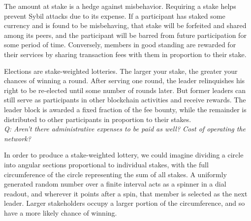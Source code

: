 \documentclass{yellowpaper}
\begin{document}
The amount at stake is a hedge against misbehavior.  Requiring a stake helps prevent Sybil attacks due to its expense. If a participant has staked some currency and is found to be misbehaving, that stake will be forfeited and shared among its peers, and the participant will be barred from future participation for some period of time. Conversely, members in good standing are rewarded for their services by sharing transaction fees with them in proportion to their stake.

Elections are stake-weighted lotteries. The larger your stake, the greater your chances of winning a round. After serving one round, the leader relinquishes his right to be re-elected until some number of rounds later. But former leaders can still serve as participants in other blockchain activities and receive rewards. The leader block is awarded a fixed fraction of the fee bounty, while the remainder is distributed to other participants in proportion to their stakes.
$$
$$
{\em{Q: Aren't there administrative expenses to be paid as well? Cost of operating the network?}}
$$
$$

In order to produce a stake-weighted lottery, we could imagine dividing a circle into angular sections proportional to individual stakes, with the full circumference of the circle representing the sum of all stakes. A uniformly generated random number over a finite interval acts as a spinner in a dial readout, and wherever it points after a spin, that member is selected as the next leader. Larger stakeholders occupy a larger portion of the circumference, and so have a more likely chance of winning.
\end{document}
